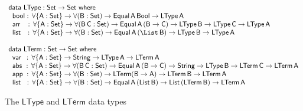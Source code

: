 \documentclass[sigplan,10pt,anonymous,review]{acmart}
\begin{document}
\begin{figure*}[t]

\begin{adjustbox}{varwidth=7.3in, max width=7.1in, margin=-0.0in 0in
      -0.2in 0in, fbox, center} 

{\small
\[\begin{array}{l}
\mathsf{data\ LType : Set \to Set\ where}\\
\mathsf{\;\;bool :\, \forall \{A : Set\} \to \forall (B : Set) \to Equal\,A\,Bool
  \to LType\,A}\\ 
\mathsf{\;\;arr\;\;\; :\, \forall \{A : Set\} \to \forall (B\,C : Set) \to
  Equal\,A\,(B \to C) \to LType\,B \to LType\,C \to LType\,A}\\ 
  \mathsf{\;\;list\,\;\; :\,  \forall \{A : Set\} \to\forall (B : Set) \to
    Equal\,A\,(\List\,B) \to LType\,B \to LType\,A}\\
  \\
\mathsf{data\ LTerm : Set \to Set\ where}\\
\mathsf{\;\;var\,\,\,:\,  \forall \{A : Set\} \to String \to LType\,A \to
  LTerm\,A} \\  
\mathsf{\;\;abs\,\, :\,  \forall \{A : Set\} \to \forall (B\,C : Set) \to
  Equal\,A\,(B \to C) \to String \to LType\,B \to LTerm\,C \to
  LTerm\,A}\\ 
  \mathsf{\;\;app\; :\,  \forall \{A : Set\} \to \forall (B : Set) \to
    LTerm (B \to A) \to LTerm\,B \to LTerm\,A} \\ 
  \mathsf{\;\;list\;\,\, :\,  \forall \{A : Set\} \to \forall (B : Set) \to
    Equal\,A\,(List\,B) \to List\,(LTerm\,B) \to LTerm\,A} 
\end{array}\]}

\vspace*{-0.1in}

\caption{The $\mathsf{LType}$ and $\mathsf{LTerm}$ data
  types}\label{fig:type-and-term}
\end{adjustbox}
\end{figure*}
\end{document}
